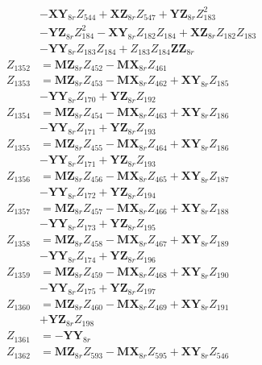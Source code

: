 \begin{multicols}{2}
\begin{align}
&- \mathbf{XY}_{8r}Z_{544} + \mathbf{XZ}_{8r}Z_{547} + \mathbf{YZ}_{8r}Z_{183}^2  \nonumber \\
&- \mathbf{YZ}_{8r}Z_{184}^2 - \mathbf{XY}_{8r}Z_{182}Z_{184} + \mathbf{XZ}_{8r}Z_{182}Z_{183}  \nonumber \\
&- \mathbf{YY}_{8r}Z_{183}Z_{184} + Z_{183}Z_{184}\mathbf{ZZ}_{8r} \nonumber \\
Z_{1352} &= \mathbf{MZ}_{8r}Z_{452} - \mathbf{MX}_{8r}Z_{461} \nonumber \\
Z_{1353} &= \mathbf{MZ}_{8r}Z_{453} - \mathbf{MX}_{8r}Z_{462} + \mathbf{XY}_{8r}Z_{185}  \nonumber \\
&- \mathbf{YY}_{8r}Z_{170} + \mathbf{YZ}_{8r}Z_{192} \nonumber \\
Z_{1354} &= \mathbf{MZ}_{8r}Z_{454} - \mathbf{MX}_{8r}Z_{463} + \mathbf{XY}_{8r}Z_{186}  \nonumber \\
&- \mathbf{YY}_{8r}Z_{171} + \mathbf{YZ}_{8r}Z_{193} \nonumber \\
Z_{1355} &= \mathbf{MZ}_{8r}Z_{455} - \mathbf{MX}_{8r}Z_{464} + \mathbf{XY}_{8r}Z_{186}  \nonumber \\
&- \mathbf{YY}_{8r}Z_{171} + \mathbf{YZ}_{8r}Z_{193} \nonumber \\
Z_{1356} &= \mathbf{MZ}_{8r}Z_{456} - \mathbf{MX}_{8r}Z_{465} + \mathbf{XY}_{8r}Z_{187}  \nonumber \\
&- \mathbf{YY}_{8r}Z_{172} + \mathbf{YZ}_{8r}Z_{194} \nonumber \\
Z_{1357} &= \mathbf{MZ}_{8r}Z_{457} - \mathbf{MX}_{8r}Z_{466} + \mathbf{XY}_{8r}Z_{188}  \nonumber \\
&- \mathbf{YY}_{8r}Z_{173} + \mathbf{YZ}_{8r}Z_{195} \nonumber \\
Z_{1358} &= \mathbf{MZ}_{8r}Z_{458} - \mathbf{MX}_{8r}Z_{467} + \mathbf{XY}_{8r}Z_{189}  \nonumber \\
&- \mathbf{YY}_{8r}Z_{174} + \mathbf{YZ}_{8r}Z_{196} \nonumber \\
Z_{1359} &= \mathbf{MZ}_{8r}Z_{459} - \mathbf{MX}_{8r}Z_{468} + \mathbf{XY}_{8r}Z_{190}  \nonumber \\
&- \mathbf{YY}_{8r}Z_{175} + \mathbf{YZ}_{8r}Z_{197} \nonumber \\
Z_{1360} &= \mathbf{MZ}_{8r}Z_{460} - \mathbf{MX}_{8r}Z_{469} + \mathbf{XY}_{8r}Z_{191}  \nonumber \\
&+ \mathbf{YZ}_{8r}Z_{198} \nonumber \\
Z_{1361} &= -\mathbf{YY}_{8r} \nonumber \\
Z_{1362} &= \mathbf{MZ}_{8r}Z_{593} - \mathbf{MX}_{8r}Z_{595} + \mathbf{XY}_{8r}Z_{546}  \nonumber \\

\end{align}
\end{multicols}
